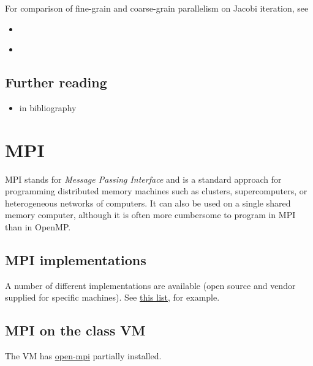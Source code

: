 \documentclass[letterpaper,10pt,english]{sphinxmanual}
\begin{document}
For comparison of fine-grain and
coarse-grain parallelism on Jacobi iteration, see
\begin{itemize}
\item {} 
{\hyperref[jacobi1d_omp1:jacobi1d\string-omp1]{}}

\item {} 
{\hyperref[jacobi1d_omp2:jacobi1d\string-omp2]{}}

\end{itemize}


\subsection{Further reading}
\label{openmp:further-reading}\begin{itemize}
\item {} 
{\hyperref[biblio:biblio\string-openmp]{}} in bibliography

\end{itemize}


\section{MPI}
\label{mpi:id1}\label{mpi::doc}\label{mpi:mpi}
MPI stands for \emph{Message Passing Interface} and is a standard approach for
programming distributed memory machines such as clusters, supercomputers, or
heterogeneous networks of computers.  It can also be used on a single
shared memory computer, although it is often more cumbersome to program in
MPI than in OpenMP.


\subsection{MPI implementations}
\label{mpi:mpi-implementations}
A number of different implementations are available (open source and vendor
supplied for specific machines).   See
\href{http://www.mcs.anl.gov/research/projects/mpi/implementations.html}{this list}, for
example.


\subsection{MPI on the class VM}
\label{mpi:mpi-on-the-class-vm}
The VM has \href{http://www.open-mpi.org/}{open-mpi}  partially installed.
\end{document}

